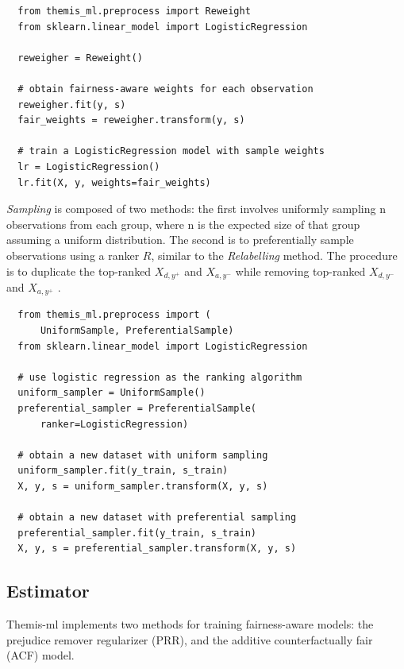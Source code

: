 \documentclass{interact}
\begin{document}
\begin{verbatim}
  from themis_ml.preprocess import Reweight
  from sklearn.linear_model import LogisticRegression

  reweigher = Reweight()

  # obtain fairness-aware weights for each observation
  reweigher.fit(y, s)
  fair_weights = reweigher.transform(y, s)

  # train a LogisticRegression model with sample weights
  lr = LogisticRegression()
  lr.fit(X, y, weights=fair_weights)
\end{verbatim}

\emph{Sampling} is composed of two methods: the first involves uniformly
sampling n observations from each group, where n is the expected size of that
group assuming a uniform distribution. The second is to preferentially sample
observations using a ranker \(R\), similar to the \emph{Relabelling} method. The
procedure is to duplicate the top-ranked \(X_{d, y^{+}}\) and \(X_{a, y^{-}}\)
while removing top-ranked \(X_{d, y^{-}}\) and \(X_{a, y^{+}}\)
\cite{kamiran2012data}.

\begin{verbatim}
  from themis_ml.preprocess import (
      UniformSample, PreferentialSample)
  from sklearn.linear_model import LogisticRegression

  # use logistic regression as the ranking algorithm
  uniform_sampler = UniformSample()
  preferential_sampler = PreferentialSample(
      ranker=LogisticRegression)

  # obtain a new dataset with uniform sampling
  uniform_sampler.fit(y_train, s_train)
  X, y, s = uniform_sampler.transform(X, y, s)

  # obtain a new dataset with preferential sampling
  preferential_sampler.fit(y_train, s_train)
  X, y, s = preferential_sampler.transform(X, y, s)
\end{verbatim}

\subsection{Estimator}

Themis-ml implements two methods for training fairness-aware models: the
prejudice remover regularizer (PRR), and the additive counterfactually fair
(ACF) model.
\end{document}
